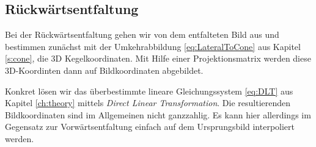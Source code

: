 \subsection{Rückwärtsentfaltung}
Bei der Rückwärtsentfaltung gehen wir von dem entfalteten Bild aus und bestimmen zunächst mit der Umkehrabbildung \ref{eq:LateralToCone} aus Kapitel \ref{s:cone}, die 3D Kegelkoordinaten. Mit Hilfe einer Projektionsmatrix werden diese 3D-Koordinten dann auf Bildkoordinaten abgebildet.

Konkret lösen wir das überbestimmte lineare Gleichungssystem \ref{eq:DLT} aus Kapitel \ref{ch:theory} mittels \textit{Direct Linear Transformation}.
Die resultierenden Bildkoordinaten sind im Allgemeinen nicht ganzzahlig. Es kann hier allerdings im Gegensatz zur Vorwärtsentfaltung einfach auf dem Ursprungsbild interpoliert werden. 


